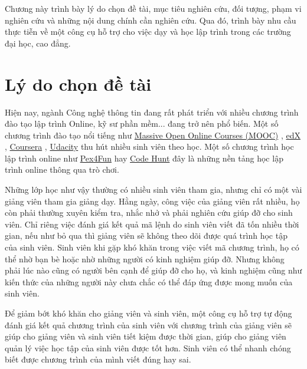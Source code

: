 Chương này trình bày lý do chọn đề tài, mục tiêu nghiên cứu, đối
tượng, phạm vi nghiên cứu và những nội dung chính cần nghiên cứu. Qua
đó, trình bày nhu cầu thực tiễn về một công cụ hỗ trợ cho việc dạy và
học lập trình trong các trường đại học, cao đẳng.

\section{Lý do chọn đề tài}

Hiện nay, ngành Công nghệ thông tin đang rất phát triển với nhiều
chương trình đào tạo lập trình Online, kỹ sư phần mềm... đang trở nên
phổ biến. Một số chương trình đào tạo nổi tiếng như
\href{https://www.coursera.org/course/saas}{Massive Open Online
  Courses (MOOC)} \cite{mooc}, \href{https://www.edx.org/}{edX}
\cite{edx}, \href{https://www.coursera.org/}{Coursera}
\cite{coursera}, \href{http://www.udacity.com/}{Udacity}
\cite{Udacity} thu hút nhiều sinh viên theo học. Một số chương trình
học lập trình online như \href{https://www.pexforfun.com/}{Pex4Fun}
\cite{Pex4Fun} hay
\href{https://www.microsoft.com/en-us/research/project/code-hunt/}{Code
  Hunt} \cite{CodeHunt} đây là những nền tảng học lập trình online
thông qua trò chơi.

Những lớp học như vậy thường có nhiều sinh viên tham gia, nhưng chỉ có
một vài giảng viên tham gia giảng dạy. Hằng ngày, công việc của giảng
viên rất nhiều, họ còn phải thường xuyên kiểm tra, nhắc nhở và phải
nghiên cứu giúp đỡ cho sinh viên. Chỉ riêng việc đánh giá kết quả mã
lệnh do sinh viên viết đã tốn nhiều thời gian, nếu như bỏ qua thì
giảng viên sẽ không theo dõi được quá trình học tập của sinh
viên. Sinh viên khi gặp khó khăn trong việc viết mã chương trình, họ
có thể nhờ bạn bè hoặc nhờ những người có kinh nghiệm giúp đỡ. Nhưng
không phải lúc nào cũng có người bên cạnh để giúp đỡ cho họ, và kinh
nghiệm cũng như kiến thức của những người này chưa chắc có thể đáp ứng
được mong muốn của sinh viên.

Để giảm bớt khó khăn cho giảng viên và sinh viên, một công cụ hỗ trợ
tự động đánh giá kết quả chương trình của sinh viên với chương trình
của giảng viên sẽ giúp cho giảng viên và sinh viên tiết kiệm được thời
gian, giúp cho giảng viên quản lý việc học tập của sinh viên được tốt
hơn. Sinh viên có thể nhanh chóng biết được chương trình của mình viết
đúng hay sai.

